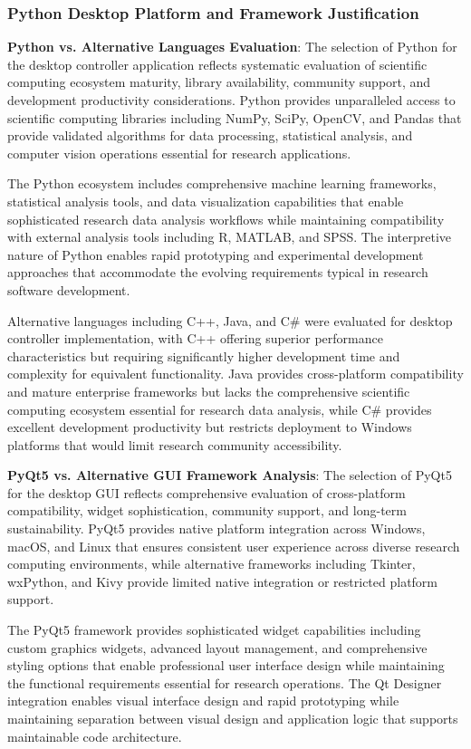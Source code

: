 \documentclass[12pt,a4paper]{article}
\begin{document}
\subsubsection{Python Desktop Platform and Framework Justification}

\textbf{Python vs. Alternative Languages Evaluation}: The selection of Python for the desktop controller application reflects
systematic evaluation of scientific computing ecosystem maturity, library availability, community support, and
development productivity considerations. Python provides unparalleled access to scientific computing libraries including
NumPy, SciPy, OpenCV, and Pandas that provide validated algorithms for data processing, statistical analysis, and
computer vision operations essential for research applications.

The Python ecosystem includes comprehensive machine learning frameworks, statistical analysis tools, and data
visualization capabilities that enable sophisticated research data analysis workflows while maintaining compatibility
with external analysis tools including R, MATLAB, and SPSS. The interpretive nature of Python enables rapid prototyping
and experimental development approaches that accommodate the evolving requirements typical in research software
development.

Alternative languages including C++, Java, and C\# were evaluated for desktop controller implementation, with C++
offering superior performance characteristics but requiring significantly higher development time and complexity for
equivalent functionality. Java provides cross-platform compatibility and mature enterprise frameworks but lacks the
comprehensive scientific computing ecosystem essential for research data analysis, while C\# provides excellent
development productivity but restricts deployment to Windows platforms that would limit research community
accessibility.

\textbf{PyQt5 vs. Alternative GUI Framework Analysis}: The selection of PyQt5 for the desktop GUI reflects comprehensive
evaluation of cross-platform compatibility, widget sophistication, community support, and long-term sustainability.
PyQt5 provides native platform integration across Windows, macOS, and Linux that ensures consistent user experience
across diverse research computing environments, while alternative frameworks including Tkinter, wxPython, and Kivy
provide limited native integration or restricted platform support.

The PyQt5 framework provides sophisticated widget capabilities including custom graphics widgets, advanced layout
management, and comprehensive styling options that enable professional user interface design while maintaining the
functional requirements essential for research operations. The Qt Designer integration enables visual interface design
and rapid prototyping while maintaining separation between visual design and application logic that supports
maintainable code architecture.
\end{document}
